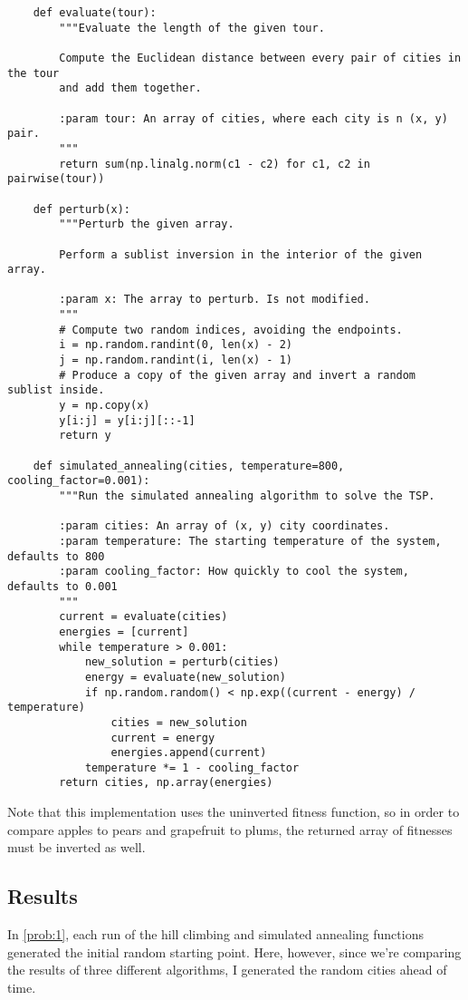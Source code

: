 \documentclass{article}
\begin{document}
\begin{verbatim}
    def evaluate(tour):
        """Evaluate the length of the given tour.

        Compute the Euclidean distance between every pair of cities in the tour
        and add them together.

        :param tour: An array of cities, where each city is n (x, y) pair.
        """
        return sum(np.linalg.norm(c1 - c2) for c1, c2 in pairwise(tour))

    def perturb(x):
        """Perturb the given array.

        Perform a sublist inversion in the interior of the given array.

        :param x: The array to perturb. Is not modified.
        """
        # Compute two random indices, avoiding the endpoints.
        i = np.random.randint(0, len(x) - 2)
        j = np.random.randint(i, len(x) - 1)
        # Produce a copy of the given array and invert a random sublist inside.
        y = np.copy(x)
        y[i:j] = y[i:j][::-1]
        return y

    def simulated_annealing(cities, temperature=800, cooling_factor=0.001):
        """Run the simulated annealing algorithm to solve the TSP.

        :param cities: An array of (x, y) city coordinates.
        :param temperature: The starting temperature of the system, defaults to 800
        :param cooling_factor: How quickly to cool the system, defaults to 0.001
        """
        current = evaluate(cities)
        energies = [current]
        while temperature > 0.001:
            new_solution = perturb(cities)
            energy = evaluate(new_solution)
            if np.random.random() < np.exp((current - energy) / temperature)
                cities = new_solution
                current = energy
                energies.append(current)
            temperature *= 1 - cooling_factor
        return cities, np.array(energies)
\end{verbatim}

Note that this implementation uses the uninverted fitness function, so in order to compare apples
to pears and grapefruit to plums, the returned array of fitnesses must be inverted as well.

\subsection{Results}
In \autoref{prob:1}, each run of the hill climbing and simulated annealing functions generated the
initial random starting point. Here, however, since we're comparing the results of three different
algorithms, I generated the random cities ahead of time.
\end{document}
